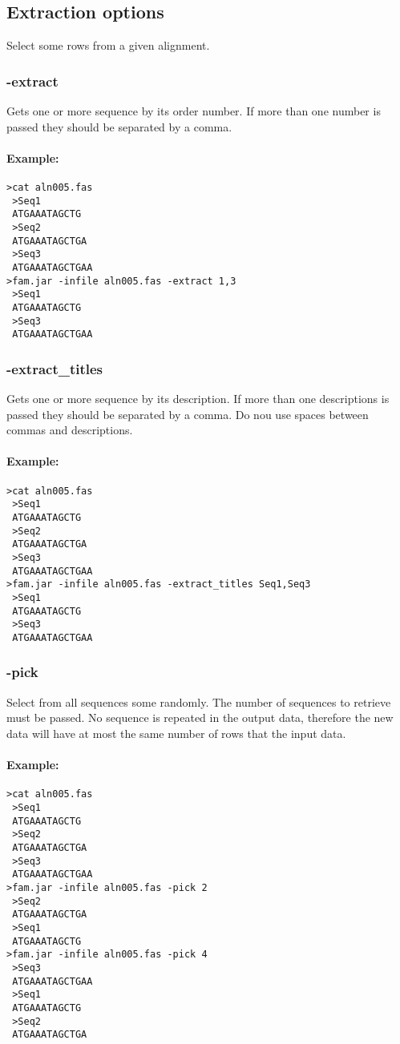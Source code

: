 \documentclass[a4paper, twoside,10pt]{article}
\begin{document}
 
\subsection{Extraction options}
Select some rows from a given alignment.

\subsubsection{-extract}
Gets one or more sequence by its order number. If more than one number is passed
they should be separated by a comma.
\paragraph{Example:}
\begin{verbatim}
>cat aln005.fas
 >Seq1
 ATGAAATAGCTG
 >Seq2
 ATGAAATAGCTGA
 >Seq3
 ATGAAATAGCTGAA
>fam.jar -infile aln005.fas -extract 1,3
 >Seq1
 ATGAAATAGCTG
 >Seq3
 ATGAAATAGCTGAA
\end{verbatim}

\subsubsection{-extract\_titles}
Gets one or more sequence by its description. If more than one descriptions is 
passed they should be separated by a comma. Do nou use spaces between commas and
descriptions.
\paragraph{Example:}
\begin{verbatim}
>cat aln005.fas
 >Seq1
 ATGAAATAGCTG
 >Seq2
 ATGAAATAGCTGA
 >Seq3
 ATGAAATAGCTGAA
>fam.jar -infile aln005.fas -extract_titles Seq1,Seq3
 >Seq1
 ATGAAATAGCTG
 >Seq3
 ATGAAATAGCTGAA
\end{verbatim}

\subsubsection{-pick}
Select from all sequences some randomly. The number of sequences to retrieve 
must be passed. No sequence is repeated in the output data, therefore the
new data will have at most the same number of rows that the input data.
\paragraph{Example:}
\begin{verbatim}
>cat aln005.fas
 >Seq1
 ATGAAATAGCTG
 >Seq2
 ATGAAATAGCTGA
 >Seq3
 ATGAAATAGCTGAA
>fam.jar -infile aln005.fas -pick 2
 >Seq2
 ATGAAATAGCTGA
 >Seq1
 ATGAAATAGCTG
>fam.jar -infile aln005.fas -pick 4
 >Seq3
 ATGAAATAGCTGAA
 >Seq1
 ATGAAATAGCTG
 >Seq2
 ATGAAATAGCTGA
\end{verbatim}
\end{document}
